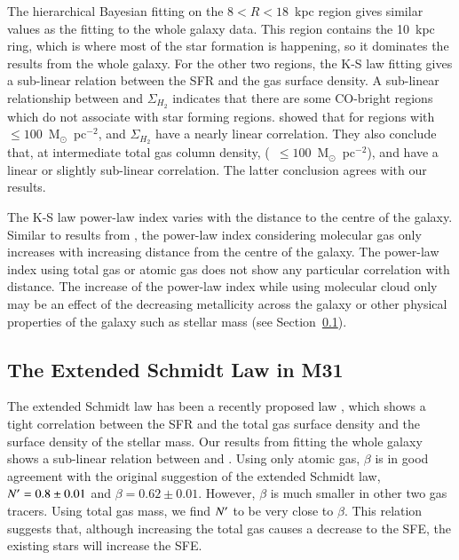 The hierarchical Bayesian fitting on the $8<R<18$~kpc region gives similar values as the fitting to the whole galaxy data. This region contains the 10~kpc ring, which is where most of the star formation is happening, so it dominates the results from the whole galaxy.  For the other two regions, the K-S law fitting gives a sub-linear relation between the SFR and the gas surface density. A sub-linear relationship between \sigmasfr and  $\Sigma_{H_2}$ indicates that there are some CO-bright regions which do not associate with star forming regions.
 \citet{Krumholz09} showed that for regions with \sigmagas~$\leq 100$~M$_{\odot}$~pc$^{-2}$, \sigmasfr and $\Sigma_{H_2}$ have a nearly linear correlation. They also conclude that, at intermediate total gas column density, (\sigmagas~$\leq 100$~M$_{\odot}$~pc$^{-2}$), \sigmasfr and \sigmagas have a linear or slightly sub-linear correlation. The latter conclusion agrees with our results.


The K-S law power-law index varies with the distance to the centre of the galaxy. Similar to results from \citet{Ford13}, the power-law index considering molecular gas only increases with increasing distance from the centre of the galaxy. The power-law index using total gas or atomic gas does not show any particular correlation with distance. The increase of the power-law index while using molecular cloud only may be an effect of the decreasing metallicity across the galaxy or other physical properties of the galaxy such as stellar mass (see Section~\ref{sec:es_res}).
  
\subsection{The Extended Schmidt Law in M31}
\label{sec:es_res}
The extended Schmidt law has been a recently proposed law \citep{Shi11}, which shows a tight correlation between the SFR and the total gas surface density and the surface density of the stellar mass. Our results from fitting the whole galaxy shows a sub-linear relation between \sigmasfr and \sigmastar.
Using only atomic gas, $\beta$ is in good agreement with the original suggestion of the extended Schmidt law, $N^\prime = 0.8 \pm 0.01$ and $\beta = 0.62\pm0.01$. However, $\beta$ is much smaller in other two gas tracers. Using total gas mass, we find $N^\prime$ to be very close to $\beta$. This relation suggests that, although increasing the total gas causes a decrease to the SFE, the existing stars will increase the SFE. 

